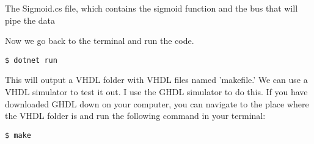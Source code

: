 \begin{listing}
  \inputminted{csharp}{codesnippets/Sigmoid.cs}
  \caption{The Sigmoid.cs file, which contains the sigmoid function and the bus that will pipe the data}
  \label{lst:sigmoidSME}
\end{listing}

Now we go back to the terminal and run the code.
\begin{lstlisting}
$ dotnet run
\end{lstlisting}

This will output a VHDL folder with VHDL files named 'makefile.’ We can use a VHDL simulator to test it out. I use the GHDL simulator to do this.  If you have downloaded GHDL down on your computer, you can navigate to the place where the VHDL folder is and run the following command in your terminal:

\begin{lstlisting}
$ make
\end{lstlisting}

